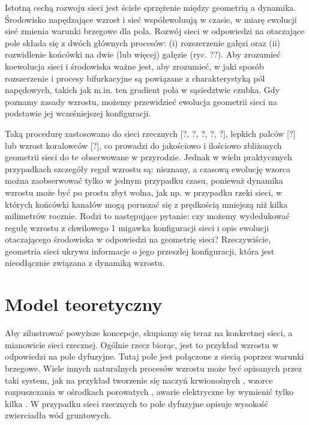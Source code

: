 \documentclass[]{pracamgr}
\begin{document}
      Istotną cechą rozwoju sieci jest ścisłe sprzężenie między geometrią a
    dynamika. Środowisko napędzające wzrost i sieć współewoluują w czasie, w miarę ewolucji
    sieć zmienia warunki brzegowe dla pola. Rozwój sieci w odpowiedzi na
    otaczające pole składa się z dwóch głównych procesów: (i) rozszerzenie gałęzi oraz (ii)
    rozwidlenie końcówki na dwie (lub więcej) gałęzie (ryc. ??). Aby zrozumieć
    koewolucja sieci i środowiska ważne jest, aby zrozumieć, w jaki sposób rozszerzenie i
    procesy bifurkacyjne są powiązane z charakterystyką pól napędowych, takich jak m.in. ten
    gradient pola w sąsiedztwie czubka. Gdy poznamy zasady wzrostu, możemy przewidzieć
    ewolucja geometrii sieci na podstawie jej wcześniejszej konfiguracji. \par
      Taką procedurę zastosowano do sieci rzecznych [?, ?, ?, ?, ?], lepkich palców [?] lub
    wzrost koralowców [?], co prowadzi do jakościowo i ilościowo zbliżonych geometrii sieci do
    te obserwowane w przyrodzie. Jednak w wielu praktycznych przypadkach szczegóły reguł wzrostu są:
    nieznany, a czasową ewolucję wzorca można zaobserwować tylko w jednym przypadku
    czasu, ponieważ dynamika wzrostu może być po prostu zbyt wolna, jak np. w przypadku rzeki
    sieci, w których końcówki kanałów mogą poruszać się z prędkością mniejszą niż kilka milimetrów rocznie.
    Rodzi to następujące pytanie: czy możemy wydedukować regułę wzrostu z chwilowego
    1
    migawka konfiguracji sieci i opis ewolucji otaczającego środowiska
    w odpowiedzi na geometrię sieci? Rzeczywiście, geometria sieci ukrywa informacje
    o jego przeszłej konfiguracji, która jest nieodłącznie związana z dynamiką wzrostu.




  \chapter{Model teoretyczny}

    Aby zilustrować powyższe koncepcje, skupiamy się teraz na konkretnej sieci, a mianowicie sieci rzecznej. Ogólnie rzecz biorąc, jest to przykład wzrostu w odpowiedzi na pole dyfuzyjne. Tutaj pole jest połączone z siecią poprzez warunki brzegowe. Wiele innych naturalnych procesów wzrostu może być opisanych przez taki system, jak na przykład tworzenie się naczyń krwionośnych \cite{nguyen2006dynamics}, wzorce rozpuszczania w ośrodkach porowatych \cite{szymczak2011initial}, awarie elektryczne \cite{niemeyer1984fractal} by wymienić tylko kilka . W przypadku sieci rzecznych to pole dyfuzyjne opisuje wysokość zwierciadła wód gruntowych.
\end{document}
